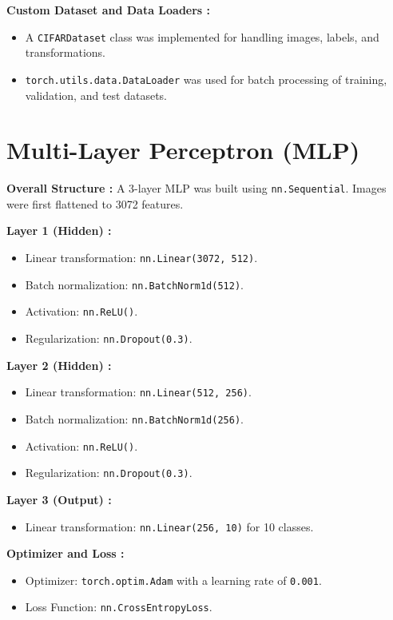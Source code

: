 \documentclass[12pt, a4paper]{report}
\begin{document}
\noindent \textbf{Custom Dataset and Data Loaders :}
\begin{itemize}
    \item A \texttt{CIFARDataset} class was implemented for handling images, labels, and transformations.
    \item \texttt{torch.utils.data.DataLoader} was used for batch processing of training, validation, and test datasets.
\end{itemize}

\section{Multi-Layer Perceptron (MLP)}
\noindent    \textbf{Overall Structure :} A 3-layer MLP was built using \texttt{nn.Sequential}.
    Images were first flattened to 3072 features.

\noindent    \textbf{Layer 1 (Hidden) :}
    \begin{itemize}
        \item Linear transformation: \texttt{nn.Linear(3072, 512)}.
        \item Batch normalization: \texttt{nn.BatchNorm1d(512)}.
        \item Activation: \texttt{nn.ReLU()}.
        \item Regularization: \texttt{nn.Dropout(0.3)}.
    \end{itemize}

\noindent    \textbf{Layer 2 (Hidden) :}
    \begin{itemize}
        \item Linear transformation: \texttt{nn.Linear(512, 256)}.
        \item Batch normalization: \texttt{nn.BatchNorm1d(256)}.
        \item Activation: \texttt{nn.ReLU()}.
        \item Regularization: \texttt{nn.Dropout(0.3)}.
    \end{itemize}

\noindent   \textbf{Layer 3 (Output) :}
    \begin{itemize}
        \item Linear transformation: \texttt{nn.Linear(256, 10)} for 10 classes.
    \end{itemize}

\noindent    \textbf{Optimizer and Loss :}
    \begin{itemize}
        \item Optimizer: \texttt{torch.optim.Adam} with a learning rate of \texttt{0.001}.
        \item Loss Function: \texttt{nn.CrossEntropyLoss}.
    \end{itemize}
\end{document}
